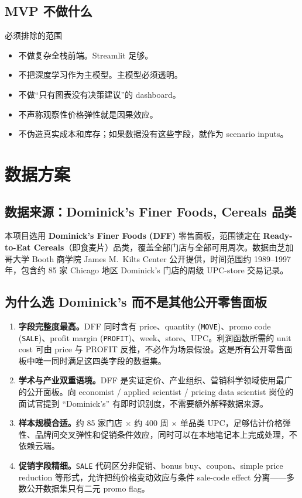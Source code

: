 \documentclass[UTF8,11pt,a4paper,fontset=none]{ctexart}
\begin{document}
\subsection{MVP 不做什么}

\begin{riskbox}{必须排除的范围}
\begin{itemize}
  \item 不做复杂全栈前端。Streamlit 足够。
  \item 不把深度学习作为主模型。主模型必须透明。
  \item 不做“只有图表没有决策建议”的 dashboard。
  \item 不声称观察性价格弹性就是因果效应。
  \item 不伪造真实成本和库存；如果数据没有这些字段，就作为 scenario inputs。
\end{itemize}
\end{riskbox}

\section{数据方案}

\subsection{数据来源：Dominick's Finer Foods, Cereals 品类}

本项目选用 \textbf{Dominick's Finer Foods (DFF)} 零售面板，范围锁定在 \textbf{Ready-to-Eat Cereals}（即食麦片）品类，覆盖全部门店与全部可用周次。数据由芝加哥大学 Booth 商学院 James M.\ Kilts Center 公开提供，时间范围约 1989--1997 年，包含约 85 家 Chicago 地区 Dominick's 门店的周级 UPC-store 交易记录。

\subsection{为什么选 Dominick's 而不是其他公开零售面板}

\begin{enumerate}
  \item \textbf{字段完整度最高。}DFF 同时含有 price、quantity (\texttt{MOVE})、promo code (\texttt{SALE})、profit margin (\texttt{PROFIT})、week、store、UPC。利润函数所需的 unit cost 可由 price 与 PROFIT 反推，不必作为场景假设。这是所有公开零售面板中唯一同时满足这四类字段的数据集。
  \item \textbf{学术与产业双重语境。}DFF 是实证定价、产业组织、营销科学领域使用最广的公开面板。向 economist / applied scientist / pricing data scientist 岗位的面试官提到 ``Dominick's'' 有即时识别度，不需要额外解释数据来源。
  \item \textbf{样本规模合适。}约 85 家门店 $\times$ 约 400 周 $\times$ 单品类 UPC，足够估计价格弹性、品牌间交叉弹性和促销条件效应，同时可以在本地笔记本上完成处理，不依赖云端。
  \item \textbf{促销字段精细。}\texttt{SALE} 代码区分非促销、bonus buy、coupon、simple price reduction 等形式，允许把纯价格变动效应与条件 sale-code effect 分离——多数公开数据集只有二元 promo flag。
\end{enumerate}
\end{document}
